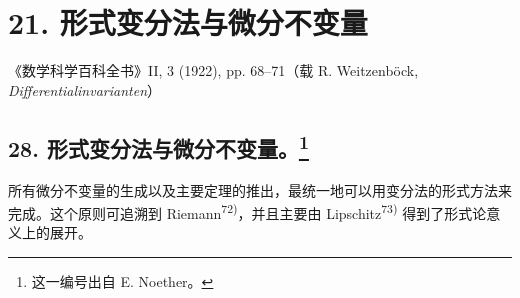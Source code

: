 \section*{21. 形式变分法与微分不变量}
\begin{center}
《数学科学百科全书》II, 3 (1922), pp. 68--71（载 R. Weitzenböck, \emph{Differentialinvarianten}）
\end{center}

\setcounter{footnote}{148}
\subsection*{28. 形式变分法与微分不变量。\footnote{这一编号出自 E. Noether。}}

所有微分不变量的生成以及主要定理的推出，最统一地可以用变分法的形式方法来完成。这个原则可追溯到 Riemann\textsuperscript{72)}，并且主要由 Lipschitz\textsuperscript{73)} 得到了形式论意义上的展开。

